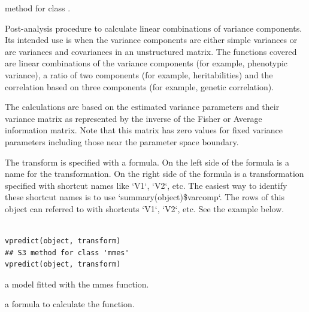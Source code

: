 \documentclass[a4paper]{book}
\begin{document}
%
\begin{Description}\relax
{} method for class .

Post-analysis procedure to calculate linear combinations of variance components. Its intended use is when the variance components are either simple variances or are variances and covariances in an unstructured matrix. The functions covered are linear combinations of the variance components (for example, phenotypic variance), a ratio of two components (for example, heritabilities) and the correlation based on three components (for example, genetic correlation). 

The calculations are based on the estimated variance parameters and their variance matrix as represented by the inverse of the Fisher or Average information matrix. Note that this matrix has zero values for fixed variance parameters including those near the parameter space boundary.

The transform is specified with a formula. On the left side of the formula is a name for the transformation. On the right side of the formula is a transformation specified with shortcut names like `V1`, `V2`, etc.  The easiest way to identify these shortcut names is to use `summary(object)\$varcomp`. The rows of this object can referred to with shortcuts `V1`, `V2`, etc.  See the example below.

\end{Description}
%
\begin{Usage}
\begin{verbatim}

vpredict(object, transform)
## S3 method for class 'mmes'
vpredict(object, transform)

\end{verbatim}
\end{Usage}
%
\begin{Arguments}
\begin{ldescription}

\item[\code{object}] a model fitted with the mmes function.

\item[\code{transform}] a formula to calculate the function.

\end{ldescription}
\end{Arguments}
\end{document}
